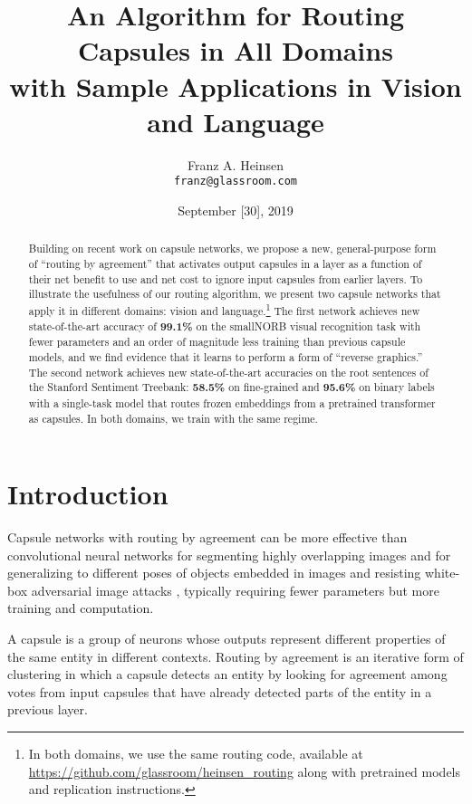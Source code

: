 \documentclass[11pt,a4paper]{article}
\title{An Algorithm for Routing Capsules in All Domains \\ with Sample Applications in Vision and Language}
\author{Franz A. Heinsen \\
{\tt franz@glassroom.com} \\ }
\date{September [30], 2019}
\begin{document}
\maketitle

\begin{abstract} 
Building on recent work on capsule networks, we propose a new, general-purpose form of ``routing by agreement'' that activates output capsules in a layer as a function of their net benefit to use and net cost to ignore input capsules from earlier layers. To illustrate the usefulness of our routing algorithm, we present two capsule networks that apply it in different domains: vision and language.\footnote{
	In both domains, we use the same routing code, available at \href{https://github.com/glassroom/heinsen\_routing}{https://github.com/glassroom/heinsen\_routing} along with pretrained models and replication instructions.
} The first network achieves new state-of-the-art accuracy of \textbf{99.1\%} on the smallNORB visual recognition task with fewer parameters and an order of magnitude less training than previous capsule models, and we find evidence that it learns to perform a form of ``reverse graphics.'' The second network achieves new state-of-the-art accuracies on the root sentences of the Stanford Sentiment Treebank: {\bf 58.5\%} on fine-grained and {\bf 95.6\%} on binary labels with a single-task model that routes frozen embeddings from a pretrained transformer as capsules. In both domains, we train with the same regime.
\end{abstract}

\section{Introduction}\label{sec:introduction}

Capsule networks with routing by agreement can be more effective than convolutional neural networks for segmenting highly overlapping images \cite{DBLP:journals/corr/abs-1710-09829} and for generalizing to different poses of objects embedded in images and resisting white-box adversarial image attacks \cite{46653}, typically requiring fewer parameters but more training and computation.

A capsule is a group of neurons whose outputs represent different properties of the same entity in different contexts. Routing by agreement is an iterative form of clustering in which a capsule detects an entity by looking for agreement among votes from input capsules that have already detected parts of the entity in a previous layer.
\end{document}
